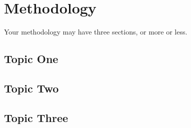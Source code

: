 \chapter{Methodology}
\label{cha:Methodology}      %

Your methodology may have three sections, or more or less.

\section{Topic One}
\lipsum
\section{Topic Two}
\lipsum
\section{Topic Three}
\lipsum